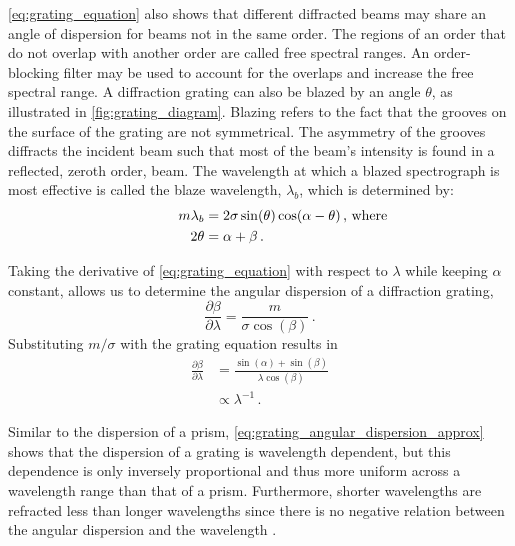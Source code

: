 \autoref{eq:grating_equation} also shows that different diffracted beams may share an angle of dispersion for beams not in the same order. The regions of an order that do not overlap with another order are called free spectral ranges. An order-blocking filter may be used to account for the overlaps and increase the free spectral range. A diffraction grating can also be blazed by an angle $\theta$, as illustrated in \autoref{fig:grating_diagram}. Blazing refers to the fact that the grooves on the surface of the grating are not symmetrical. The asymmetry of the grooves diffracts the incident beam such that most of the beam's intensity is found in a reflected, zeroth order, beam. The wavelength at which a blazed spectrograph is most effective is called the blaze wavelength, $\lambda_{b}$, which is determined by:
\begin{equation} \label{eq:blaze_wavelength}
    \begin{aligned}
        m\lambda_{b} &= 2\sigma\sin(\theta)\cos(\alpha - \theta)\rlap{\,,\ where}\\
        2\theta &= \alpha + \beta\,.
    \end{aligned}
\end{equation}

Taking the derivative of \autoref{eq:grating_equation} with respect to $\lambda$ while keeping $\alpha$ constant, allows us to determine the angular dispersion of a diffraction grating,
\begin{equation} \label{eq:grating_angular_dispersion}
    \frac{\partial \beta}{\partial \lambda} = \frac{m}{\sigma \cos(\beta)}\,.
\end{equation}
Substituting $m / \sigma$ with the grating equation results in
\begin{equation} \label{eq:grating_angular_dispersion_approx}
    \begin{aligned}
        \frac{\partial \beta}{\partial \lambda} &= \frac{\sin(\alpha) + \sin(\beta)}{\lambda \cos(\beta)}\\
        &\propto \lambda^{-1}\,.
    \end{aligned}
\end{equation}

Similar to the dispersion of a prism, \autoref{eq:grating_angular_dispersion_approx} shows that the dispersion of a grating is wavelength dependent, but this dependence is only inversely proportional and thus more uniform across a wavelength range than that of a prism. Furthermore, shorter wavelengths are refracted less than longer wavelengths since there is no negative relation between the angular dispersion and the wavelength \citep{BirneyObsAstro, Hecht_optics}.

